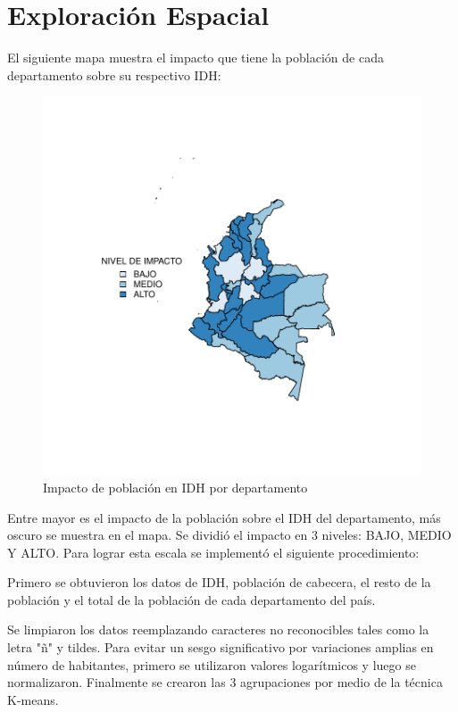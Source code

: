 \documentclass{article}
\begin{document}




\section{Exploración Espacial}

El siguiente mapa muestra el impacto que tiene la población de cada departamento sobre su respectivo IDH:








 
 
\begin{figure}[h]
\centering
\begin{adjustbox}{width=8cm,height=6cm,clip,trim=1.5cm 2cm 0cm 2.5cm}
\includegraphics{basico32departamentos-plotMap0}
\end{adjustbox}
\caption{Impacto de población en IDH por departamento}\label{rawmap}
\end{figure}

Entre mayor es el impacto de la población sobre el IDH del departamento, más oscuro se muestra en el mapa. Se dividió el impacto en 3 niveles: BAJO, MEDIO Y ALTO.
Para lograr esta escala se implementó el siguiente procedimiento:

Primero se obtuvieron los datos de IDH, población de cabecera, el resto de la población y el total de la población de cada departamento del país.

Se limpiaron los datos reemplazando caracteres no reconocibles tales como la letra "ñ" y tildes.
Para evitar un sesgo significativo por variaciones amplias en número de habitantes, primero se utilizaron valores logarítmicos y luego se normalizaron. Finalmente se crearon las 3 agrupaciones por medio de la técnica K-means.
\end{document}
